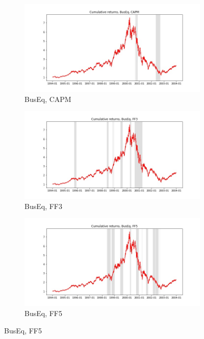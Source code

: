 \documentclass{article}
\begin{document}
 \begin{figure}
  \centering
  \begin{subfigure}[b]{0.3\textwidth}
    \centering
    \includegraphics[width=\textwidth]{BusEq/bwunif_full_cumrets_ofint_CAPM.jpg}
    \caption{BusEq, CAPM}
    \label{fig:1}
  \end{subfigure}
  \begin{subfigure}[b]{0.3\textwidth}
    \centering
    \includegraphics[width=\textwidth]{BusEq/bwunif_full_cumrets_ofint_FF3.jpg}
    \caption{BusEq, FF3}
    \label{fig:2}
  \end{subfigure}
    \begin{subfigure}[b]{0.3\textwidth}
    \centering
    \includegraphics[width=\textwidth]{BusEq/bwunif_full_cumrets_ofint_FF5.jpg}
    \caption{BusEq, FF5}
    \label{fig:1}
  \end{subfigure}
  \end{figure}
\end{document}
